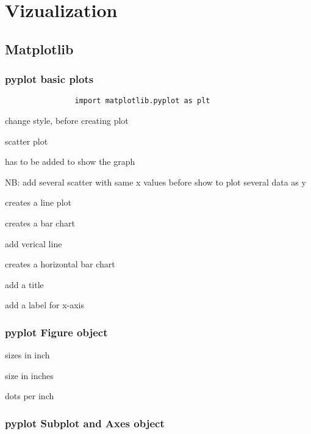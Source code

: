 \section{Vizualization}

	\subsection{Matplotlib}

		\subsubsection{pyplot basic plots}
	
			\begin{lstlisting}
				import matplotlib.pyplot as plt
			\end{lstlisting}

			 change style, before creating plot

			  scatter plot

			 has to be added to show the graph

			NB: add several scatter with same x values before show to plot several data as y

			 creates a line plot

			 creates a bar chart

			 add verical line 

			 creates a horizontal bar chart

			 add a title

			 add a label for x-axis


		\subsubsection{pyplot Figure object}

			 sizes in inch

			 size in inches

			 dots per inch


		\subsubsection{pyplot Subplot and Axes object}


